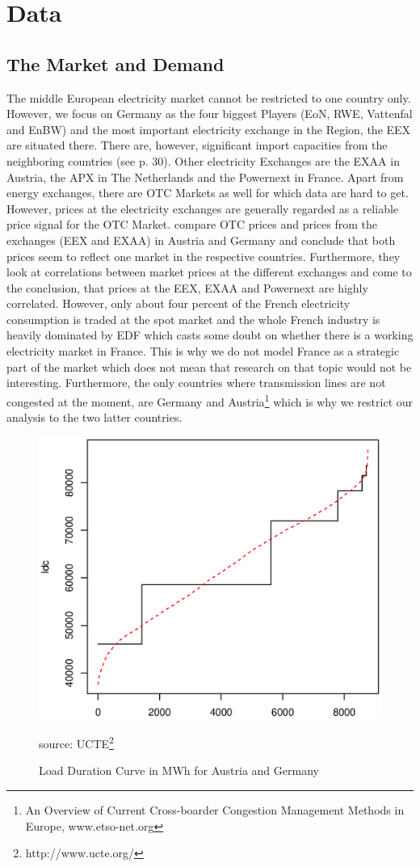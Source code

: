 \section{Data}

\subsection{The Market and Demand}

The middle European electricity market cannot be restricted to one country only. However, we focus on Germany as the four biggest Players (EoN, RWE, Vattenfal and EnBW) and the most important electricity exchange in the Region, the EEX are situated there. There are, however, significant import capacities from the neighboring countries (see \cite{Ellersdorfer2005}p. 30). Other electricity Exchanges are the EXAA in Austria, the APX in The Netherlands and the Powernext in France. Apart from energy exchanges, there are OTC Markets as well for which data are hard to get. However, prices at the electricity exchanges are generally regarded as a reliable price signal for the OTC Market. \cite{Holler2006} compare OTC prices and prices from the exchanges (EEX and EXAA) in Austria and Germany and conclude that both prices seem to reflect one market in the respective countries. Furthermore, they look at correlations between market prices at the different exchanges and come to the conclusion, that prices at the EEX, EXAA and Powernext are highly correlated. However, only about four percent of the French electricity consumption is traded at the spot market and the whole French industry is heavily dominated by EDF which casts some doubt on whether there is a working electricity market in France. This is why we do not model France as a strategic part of the market which does not mean that research on that topic would not be interesting. Furthermore, the only countries where transmission lines are not congested at the moment, are Germany and Austria\footnote{An Overview of Current Cross-boarder Congestion Management Methods in Europe, www.etso-net.org} which is why we restrict our analysis to the two latter countries.
\begin{figure}[h]
\centering
\includegraphics[width=.5\textwidth]{data/ldc}
      \label{fig:ldc}
      \caption{Load Duration Curve in MWh for Austria and Germany}
      source: UCTE\footnote{http://www.ucte.org/}
\end{figure}
